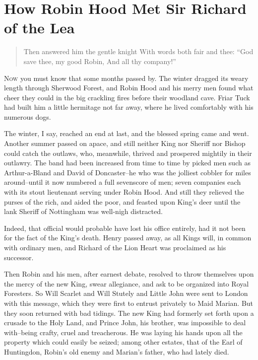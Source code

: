 \chapter{How Robin Hood Met Sir Richard of the Lea}

\begin{quote}
Then answered him the gentle knight
With words both fair and thee:
“God save thee, my good Robin,
And all thy company!”
\end{quote}

\lettrine{N}{ow} you must know that some months passed by. The winter dragged its
weary length through Sherwood Forest, and Robin Hood and his merry men
found what cheer they could in the big crackling fires before their
woodland cave. Friar Tuck had built him a little hermitage not far away,
where he lived comfortably with his numerous dogs.

The winter, I say, reached an end at last, and the blessed spring came
and went. Another summer passed on apace, and still neither King nor
Sheriff nor Bishop could catch the outlaws, who, meanwhile, thrived and
prospered mightily in their outlawry. The band had been increased from
time to time by picked men such as Arthur-a-Bland and David of
Doncaster--he who was the jolliest cobbler for miles around--until it
now numbered a full sevenscore of men; seven companies each with its
stout lieutenant serving under Robin Hood. And still they relieved the
purses of the rich, and aided the poor, and feasted upon King's deer
until the lank Sheriff of Nottingham was well-nigh distracted.

Indeed, that official would probable have lost his office entirely, had
it not been for the fact of the King's death. Henry passed away, as all
Kings will, in common with ordinary men, and Richard of the Lion Heart
was proclaimed as his successor.

Then Robin and his men, after earnest debate, resolved to throw
themselves upon the mercy of the new King, swear allegiance, and ask to
be organized into Royal Foresters. So Will Scarlet and Will Stutely and
Little John were sent to London with this message, which they were first
to entrust privately to Maid Marian. But they soon returned with bad
tidings. The new King had formerly set forth upon a crusade to the Holy
Land, and Prince John, his brother, was impossible to deal with--being
crafty, cruel and treacherous. He was laying his hands upon all the
property which could easily be seized; among other estates, that of the
Earl of Huntingdon, Robin's old enemy and Marian's father, who had
lately died.

